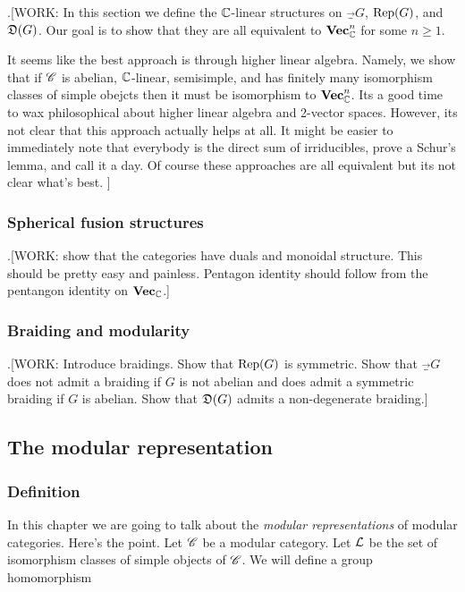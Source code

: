 .[WORK: In this section we define the $\mathbb{C}$-linear structures on $\Vec_G$, $\operatorname{Rep}(G)$, and $\mathfrak{D}(G)$. Our goal is to show that they are all equivalent to $\mathbf{Vec}_{\mathbb{C}}^n$ for some $n\geq 1$.

It seems like the best approach is through higher linear algebra. Namely, we show that if $\mathscr{C}$ is abelian, $\mathbb{C}$-linear, semisimple, and has finitely many isomorphism classes of simple obejcts then it must be isomorphism to $\mathbf{Vec}_{\mathbb{C}}^n$. Its a good time to wax philosophical about higher linear algebra and 2-vector spaces. However, its not clear that this approach actually helps at all. It might be easier to immediately note that everybody is the direct sum of irriducibles, prove a Schur's lemma, and call it a day. Of course these approaches are all equivalent but its not clear what's best.
]

\subsubsection{Spherical fusion structures}

.[WORK: show that the categories have duals and monoidal structure. This should be pretty easy and painless. Pentagon identity should follow from the pentangon identity on $\mathbf{Vec}_{\mathbb{C}}$.]

\subsubsection{Braiding and modularity}

.[WORK: Introduce braidings. Show that $\operatorname{Rep}(G)$ is symmetric. Show that $\Vec_G$ does not admit a braiding if $G$ is not abelian and does admit a symmetric braiding if $G$ is abelian. Show that $\mathfrak{D}(G)$ admits a non-degenerate braiding.]


\subsection{The modular representation}

\subsubsection{Definition}

In this chapter we are going to talk about the \textit{modular representations} of modular categories. Here's the point. Let $\mathscr{C}$ be a modular category. Let $\mathcal{L}$ be the set of isomorphism classes of simple objects of $\mathscr{C}$. We will define a group homomorphism

